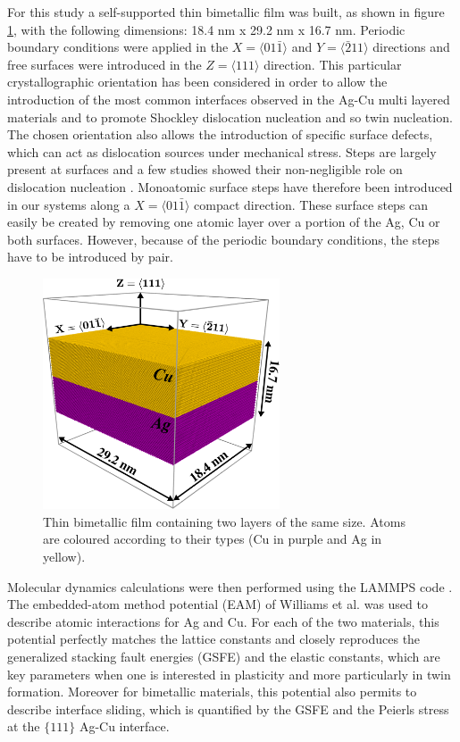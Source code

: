 \documentclass[final,3p,times,twocolumn]{elsarticle}
\begin{document}
For this study a self-supported thin bimetallic film was built, as shown in figure \ref{fig_mod_geo}, with the following dimensions: 18.4 nm x 29.2 nm x 16.7 nm. Periodic boundary conditions were applied in the $X=\langle01\bar{1}\rangle$ and $Y=\langle\bar{2}11\rangle$ directions and free surfaces were introduced in the $Z=\langle111\rangle$ direction. This particular crystallographic orientation has been considered in order to allow the introduction of the most common interfaces observed in the Ag-Cu multi layered materials and to promote Shockley dislocation nucleation and so twin nucleation. The chosen orientation also allows the introduction of specific surface defects, which can act as dislocation sources under mechanical stress. Steps are largely present at surfaces and a few studies showed their non-negligible role on dislocation nucleation \cite{brochard00PMA,hirel07SM,navarro08PRL}. Monoatomic surface steps have therefore been introduced in our systems along a $X=\langle01\bar{1}\rangle$ compact direction. These surface steps can easily be created by removing one atomic layer over a portion of the Ag, Cu or both surfaces. However, because of the periodic boundary conditions, the steps have to be introduced by pair. 
\begin{figure}[!h]
	\begin{center}
		\includegraphics[width=70mm]{Pic/mod_geo.eps} 
	\end{center}
	\caption{Thin bimetallic film containing two layers of the same size. Atoms are coloured according to their types (Cu in purple and Ag in yellow).}\label{fig_mod_geo}
\end{figure}

Molecular dynamics calculations were then performed using the LAMMPS code \cite{plimpton95JCP}. The  embedded-atom method potential (EAM) of Williams et al. \cite{williams06MSMSE} was used to describe atomic interactions for Ag and Cu. For each of the two materials, this potential perfectly matches the lattice constants and closely reproduces the generalized stacking fault energies (GSFE) and the elastic constants, which are key parameters when one is interested in plasticity and more particularly in twin formation. Moreover for bimetallic materials, this potential also permits to describe interface sliding, which is quantified by the GSFE and the Peierls stress \cite{li15PM} at the $\lbrace111\rbrace$ Ag-Cu interface.
\end{document}
